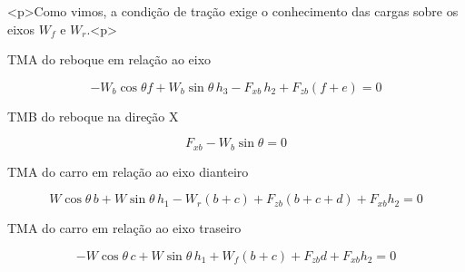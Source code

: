 <p>Como vimos, a condição de tração exige o conhecimento das cargas sobre os eixos \(W_f\) e \(W_r\).<p>

TMA do reboque em relação ao eixo

\begin{equation} \label{eq:reboqueTMA}
	-W_b \cos \theta f + W_b \sin \theta \, h_3 - F_{xb} \, h_2 + F_{zb}(f+e) = 0
\end{equation}

TMB do reboque na direção X

\begin{equation} \label{eq:reboqueTMB}
	F_{xb} - W_b \sin \theta = 0
\end{equation}

TMA do carro em relação ao eixo dianteiro

\begin{equation} \label{eq:carroTMAf}
	W \cos \theta \, b + W \sin \theta \, h_1 - W_r (b+c) + F_{zb}(b+c+d) + F_{xb} h_2 = 0
\end{equation}

TMA do carro em relação ao eixo traseiro

\begin{equation} \label{eq:carroTMAr}
	-W \cos \theta \, c + W \sin \theta \, h_1 + W_f (b+c) + F_{zb} d + F_{xb} h_2 = 0
\end{equation}

